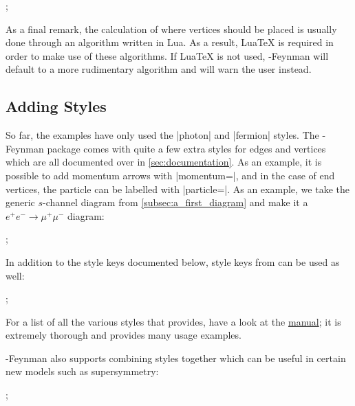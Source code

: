 \documentclass[a4paper,final]{ltxdoc}
\providecommand{\LuaTeX}{Lua\TeX}
\providecommand{\tikzfeynmanname}{\tikzname-Feynman}
\providecommand{\pgfmanual}{\href{http://mirrors.ctan.org/graphics/pgf/base/doc/pgfmanual.pdf}{\tikzname{} manual}}
\begin{document}
\begin{codeexample}[]
;
\end{codeexample}

As a final remark, the calculation of where vertices should be placed is usually
done through an algorithm written in Lua.  As a result, \LuaTeX{} is required in
order to make use of these algorithms.  If \LuaTeX{} is not used,
\tikzfeynmanname{} will default to a more rudimentary algorithm and will warn
the user instead.

\subsection{Adding Styles}
\label{subsec:adding_styles}

So far, the examples have only used the |photon| and |fermion| styles.  The
\tikzfeynmanname{} package comes with quite a few extra styles for edges and
vertices which are all documented over in \cref{sec:documentation}.  As an
example, it is possible to add momentum arrows with |momentum=|, and
in the case of end vertices, the particle can be labelled with
|particle=|.  As an example, we take the generic \(s\)-channel
diagram from \cref{subsec:a_first_diagram} and make it a \(e^{+}e^{-} \to
\mu^{+}\mu^{-}\) diagram:
\begin{codeexample}[]
;
\end{codeexample}
In addition to the style keys documented below, style keys from \tikzname{} can
be used as well:
\begin{codeexample}[]
;
\end{codeexample}
For a list of all the various styles that \tikzname{} provides, have a look at
the \pgfmanual; it is extremely thorough and provides many usage examples.

\tikzfeynmanname{} also supports combining styles together which can be useful
in certain new models such as supersymmetry:
\begin{codeexample}[]
;
\end{codeexample}
\end{document}
